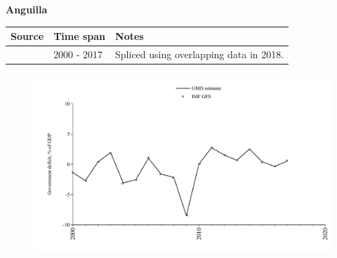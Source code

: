 \documentclass[12pt,a4paper,landscape]{article}
\begin{document}
\begin{adjustbox}{max totalsize={\paperwidth}{\paperheight},center}
\begin{minipage}[t][\textheight][t]{\textwidth}
\vspace*{0.5cm}
{}
\begin{center}
{\Large\bfseries Anguilla}
\end{center}
\vspace{0.5cm}
\begin{table}[H]
\centering
\small
\begin{tabular}{|l|l|l|}
\hline
\textbf{Source} & \textbf{Time span} & \textbf{Notes} \\
\hline
\rowcolor{white}\cite{IMF_GFS}& 2000 - 2017 &Spliced using overlapping data in 2018.\\
\hline
\end{tabular}
\end{table}
\begin{figure}[H]
\centering
\includegraphics[width=\textwidth,height=0.6\textheight,keepaspectratio]{graphs/AIA_govdef_GDP.pdf}
\end{figure}
\end{minipage}
\end{adjustbox}
\end{document}
